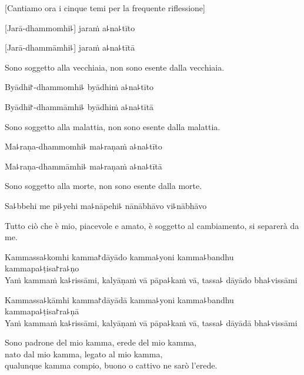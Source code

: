 \begin{english}
  [Cantiamo ora i cinque temi per la frequente riflessione]
\end{english}

%
[Jarā-dhammomhi꜕] jaraṁ a꜕na꜕tīto

%
[Jarā-dhammāmhi꜕] jaraṁ a꜕na꜕tītā

\begin{english}
Sono soggetto alla vecchiaia, non sono esente dalla vecchiaia.
\end{english}

%
Byādhi꜓-dhammomhi꜕ byādhiṁ a꜕na꜕tīto

%
Byādhi꜓-dhammāmhi꜕ byādhiṁ a꜕na꜕tītā

\begin{english}
Sono soggetto alla malattia, non sono esente dalla malattia.
\end{english}

%
Ma꜕raṇa-dhammomhi꜕ ma꜕raṇaṁ a꜕na꜕tīto

%
Ma꜕raṇa-dhammāmhi꜕ ma꜕raṇaṁ a꜕na꜕tītā

\begin{english}
Sono soggetto alla morte, non sono esente dalla morte.
\end{english}

Sa꜕bbehi me pi꜕yehi ma꜕nāpehi꜕ nānābhāvo vi꜕nābhāvo

\begin{english}
Tutto ciò che è mio, piacevole e amato, è soggetto al cambiamento, si separerà da me.
\end{english}

%
Kammassa꜕komhi kamma꜓dāyādo kamma꜕yoni kamma꜕bandhu kammapa꜕ṭisa꜓ra꜕ṇo\\
Yaṁ kammaṁ ka꜕rissāmi, kalyāṇaṁ vā pāpa꜕kaṁ vā, tassa꜕ dāyādo bha꜕vissāmi

\clearpage

%
Kammassa꜕kāmhi kamma꜓dāyādā kamma꜕yoni kamma꜕bandhu kammapa꜕ṭisa꜓ra꜕ṇā\\
Yaṁ kammaṁ ka꜕rissāmi, kalyāṇaṁ vā pāpa꜕kaṁ vā, tassa꜕ dāyādā bha꜕vissāmi

\begin{english}
Sono padrone del mio kamma, erede del mio kamma,\\
 nato dal mio kamma, legato al mio kamma, \\
 qualunque kamma compio, buono o cattivo ne sarò l'erede.
\end{english}

